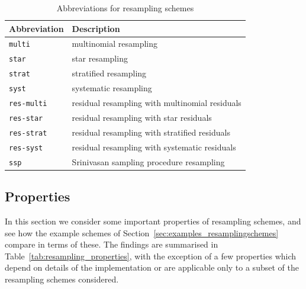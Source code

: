 \begin{table}[ht]
\centering
\begin{tabular}{ l l }
\hline\hline
Abbreviation & Description \\%
\hline
\texttt{multi} & multinomial resampling \\%
\texttt{star} & star resampling \\%
\texttt{strat} & stratified resampling \\%
\texttt{syst} & systematic resampling \\%
\texttt{res-multi} & residual resampling with multinomial residuals \\
\texttt{res-star} & residual resampling with star residuals \\
\texttt{res-strat} & residual resampling with stratified residuals \\
\texttt{res-syst} & residual resampling with systematic residuals \\
\texttt{ssp} & Srinivasan sampling procedure resampling \\%
\hline\hline
\end{tabular}
\caption{Abbreviations for resampling schemes}
\label{tab:resampling_abbrevs}
\end{table} 





\subsection{Properties}\label{sec:resampling_properties}
In this section we consider some important properties of resampling schemes, and see how the example schemes of Section~\ref{sec:examples_resamplingschemes} compare in terms of these.
The findings are summarised in Table~\ref{tab:resampling_properties}, with the exception of a few properties which depend on details of the implementation or are applicable only to a subset of the resampling schemes considered.


